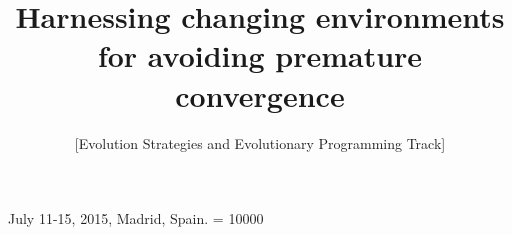 \documentclass{sig-alternate}
\begin{document}
 {July 11-15, 2015, Madrid, Spain.}
\widowpenalty = 10000
%

\title{Harnessing changing environments for avoiding premature
convergence}%
\subtitle{[Evolution Strategies and Evolutionary Programming Track]
}
%
%
%
%
%
\end{document}
